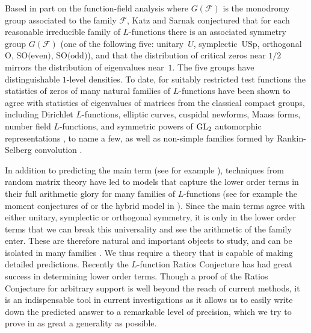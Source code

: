 \documentclass[12pt,reqno]{amsart}
\numberwithin{equation}{section}
\theoremstyle{plain}
\begin{document}
Based in part on the function-field analysis where $G(\mathcal{F})$ is the monodromy group associated to the family
$\mathcal{F}$, Katz and Sarnak conjectured that for each reasonable irreducible family of $L$-functions there is an associated symmetry group $G(\mathcal{F})$ (one of the following five: unitary~$U$, symplectic~${\text{USp}}$, orthogonal~${\text{O}}$, ${\text{SO(even)}}$, ${\text{SO(odd)}}$), and that the distribution of critical zeros near $1/2$ mirrors the distribution of eigenvalues near~$1$. The five groups have distinguishable $1$-level densities. To date, for suitably restricted test functions the statistics of zeros of many natural families of $L$-functions have been shown to agree with statistics of eigenvalues of matrices from the classical compact groups, including Dirichlet $L$-functions, elliptic curves, cuspidal newforms, Maass forms, number field $L$-functions, and symmetric powers of ${\rm GL}_2$ automorphic representations \cite{AM,AAILMZ,DM1,FI,Gao,Gu,HM,HR,ILS,KaSa1,KaSa2,Mil1,MilPe,RR,Ro,Rub,ShTe,Ya,Yo2}, to name a few, as well as non-simple families formed by Rankin-Selberg convolution \cite{DM2}.

In addition to predicting the main term (see for example \cite{Con,KaSa1,KaSa2,KeSn1,KeSn2,KeSn3}), techniques from random matrix theory have led to models that capture the lower order terms in their full arithmetic glory for many families of $L$-functions (see for example the moment conjectures of \cite{CFKRS} or the hybrid model in \cite{GHK}). Since the main terms agree with either unitary, symplectic or orthogonal symmetry, it is only in the lower order terms that we can break this universality and see the arithmetic of the family  enter. These are therefore natural and important objects to study, and can be isolated in many families \cite{HKS,Mil2,Yo1}. We thus require a theory that is capable of making detailed predictions. Recently the $L$-function Ratios Conjecture \cite{CFZ1,CFZ2} has had great success in determining lower order terms. Though a proof of the Ratios Conjecture for arbitrary support is well beyond the reach of current methods, it is an indispensable tool in current investigations as it allows us to easily write down the predicted answer to a remarkable level of precision, which we try to prove in as great a generality as possible.
\end{document}
